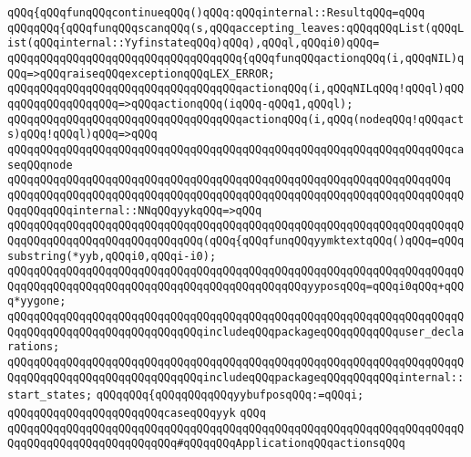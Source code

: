 \verb|qQQq{qQQqfunqQQqcontinueqQQq()qQQq:qQQqinternal::ResultqQQq=qQQq|\newline
\verb|qQQqqQQq{qQQqfunqQQqscanqQQq(s,qQQqaccepting_leaves:qQQqqQQqList(qQQqList(qQQqinternal::YyfinstateqQQq)qQQq),qQQql,qQQqi0)qQQq=|\newline
\verb|qQQqqQQqqQQqqQQqqQQqqQQqqQQqqQQqqQQq{qQQqfunqQQqactionqQQq(i,qQQqNIL)qQQq=>qQQqraiseqQQqexceptionqQQqLEX_ERROR;|\newline
\verb|qQQqqQQqqQQqqQQqqQQqqQQqqQQqqQQqqQQqactionqQQq(i,qQQqNILqQQq!qQQql)qQQqqQQqqQQqqQQqqQQq=>qQQqactionqQQq(iqQQq-qQQq1,qQQql);|\newline
\verb|qQQqqQQqqQQqqQQqqQQqqQQqqQQqqQQqqQQqactionqQQq(i,qQQq(nodeqQQq!qQQqacts)qQQq!qQQql)qQQq=>qQQq|\newline
\verb|qQQqqQQqqQQqqQQqqQQqqQQqqQQqqQQqqQQqqQQqqQQqqQQqqQQqqQQqqQQqqQQqqQQqcaseqQQqnode|\newline
\verb|qQQqqQQqqQQqqQQqqQQqqQQqqQQqqQQqqQQqqQQqqQQqqQQqqQQqqQQqqQQqqQQqqQQq|\newline
\verb|qQQqqQQqqQQqqQQqqQQqqQQqqQQqqQQqqQQqqQQqqQQqqQQqqQQqqQQqqQQqqQQqqQQqqQQqqQQqqQQqinternal::NNqQQqyykqQQq=>qQQq|\newline
\verb|qQQqqQQqqQQqqQQqqQQqqQQqqQQqqQQqqQQqqQQqqQQqqQQqqQQqqQQqqQQqqQQqqQQqqQQqqQQqqQQqqQQqqQQqqQQqqQQqqQQq(qQQq{qQQqfunqQQqyymktextqQQq()qQQq=qQQqsubstring(*yyb,qQQqi0,qQQqi-i0);|\newline
\verb|qQQqqQQqqQQqqQQqqQQqqQQqqQQqqQQqqQQqqQQqqQQqqQQqqQQqqQQqqQQqqQQqqQQqqQQqqQQqqQQqqQQqqQQqqQQqqQQqqQQqqQQqqQQqqQQqqQQqyyposqQQq=qQQqi0qQQq+qQQq*yygone;|\newline
\verb|qQQqqQQqqQQqqQQqqQQqqQQqqQQqqQQqqQQqqQQqqQQqqQQqqQQqqQQqqQQqqQQqqQQqqQQqqQQqqQQqqQQqqQQqqQQqqQQqqQQqincludeqQQqpackageqQQqqQQqqQQquser_declarations;|\newline
\verb|qQQqqQQqqQQqqQQqqQQqqQQqqQQqqQQqqQQqqQQqqQQqqQQqqQQqqQQqqQQqqQQqqQQqqQQqqQQqqQQqqQQqqQQqqQQqqQQqqQQqincludeqQQqpackageqQQqqQQqqQQqinternal::start_states;|\newline
\verb|qQQqqQQq{qQQqqQQqqQQqyybufposqQQq:=qQQqi;|\newline
\verb|qQQqqQQqqQQqqQQqqQQqqQQqcaseqQQqyyk|\newline
\verb|qQQq|\newline
\newline
\verb|qQQqqQQqqQQqqQQqqQQqqQQqqQQqqQQqqQQqqQQqqQQqqQQqqQQqqQQqqQQqqQQqqQQqqQQqqQQqqQQqqQQqqQQqqQQqqQQq#qQQqqQQqApplicationqQQqactionsqQQq|\newline
\newline
